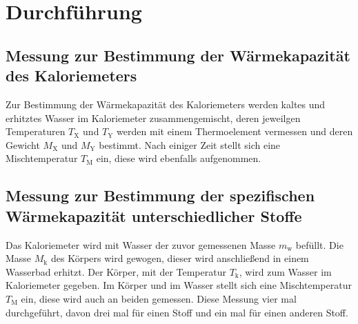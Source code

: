 \section{Durchführung}
\label{sec:Durchführung}
\subsection{Messung zur Bestimmung der Wärmekapazität des Kaloriemeters}
Zur Bestimmung der Wärmekapazität des Kaloriemeters werden kaltes und erhitztes
Wasser im Kaloriemeter zusammengemischt, deren jeweilgen Temperaturen
$T_{\mathrm{X}}$ und $T_{\mathrm{Y}}$ werden mit einem
Thermoelement vermessen und deren Gewicht $M_{\mathrm{X}}$ und $M_{\mathrm{Y}}$
bestimmt. Nach einiger Zeit stellt sich eine Mischtemperatur $T_{\mathrm{M}}$
ein, diese wird ebenfalls aufgenommen.

\subsection{Messung zur Bestimmung der spezifischen Wärmekapazität unterschiedlicher Stoffe}
Das Kaloriemeter wird mit Wasser der zuvor gemessenen Masse $m_{\mathrm{w}}$ befüllt.
Die Masse $M_\mathrm{k}$ des Körpers wird gewogen, dieser wird anschließend in einem
Wasserbad erhitzt. Der Körper, mit der Temperatur $T_{\mathrm{k}}$, wird zum Wasser
im Kaloriemeter gegeben. Im Körper und im Wasser stellt sich eine Mischtemperatur
$T_{\mathrm{M}}$ ein, diese wird auch an beiden gemessen.
Diese Messung vier mal durchgeführt, davon drei mal für einen Stoff und ein mal für einen
anderen Stoff.

